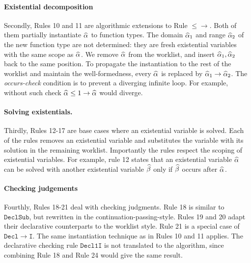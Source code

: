 \paragraph{Existential decomposition}
Secondly, Rules 10 and 11 are algorithmic extensions to Rule $\mathtt{{\le}{\to}}$.
Both of them partially instantiate $\al$ to function types.
The domain $\al[1]$ and range $\al[2]$ of the new function type are not determined:
they are fresh existential variables with the same scope as $\al$.
We remove $\al$ from the worklist, and insert $\al[1], \al[2]$ back to the same position.
To propagate the instantiation to the rest of the worklist and maintain the well-formedness,
every $\al$ is replaced by $\al[1] \to \al[2]$.
The \emph{occurs-check} condition is to prevent a diverging infinite loop.
For example, without such check $\al \le 1 \to \al$ would diverge.

\paragraph{Solving existentials.} Thirdly, Rules 12-17 are base cases where an existential variable is solved.
Each of the rules removes an existential variable and substitutes the
variable with its solution in the remaining worklist. Importantly the rules
respect the scoping of existential variables. For example, rule 12 
states that an existential variable $\al$ can be solved with another
existential variable $\bt$ only if $\bt$ occurs after $\al$.

\paragraph{Checking judgements}
Fourthly, Rules 18-21 deal with checking judgments.
Rule 18 is similar to $\mathtt{DeclSub}$, but rewritten in the
continuation-passing-style.
Rules 19 and 20 adapt their declarative counterparts to the worklist style.
Rule 21 is a special case of $\mathtt{Decl\to I}$.
The same instantiation technique as in Rules 10 and 11 applies.
The declarative checking rule $\mathtt{Decl1I}$ is not translated to the algorithm,
since combining Rule 18 and Rule 24 would give the same result.

